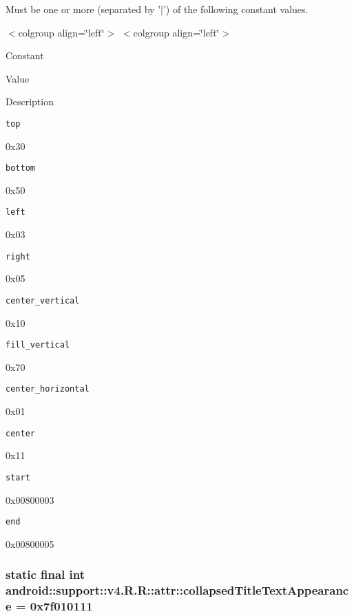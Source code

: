 Must be one or more (separated by '$|$') of the following constant values. \begin{TabularC}{0}
\hline
\end{TabularC}
$<$colgroup align=\char`\"{}left\char`\"{}$>$ $<$colgroup align=\char`\"{}left\char`\"{}$>$ 

Constant

Value

Description 

{\tt top}

0x30

{\tt bottom}

0x50

{\tt left}

0x03

{\tt right}

0x05

{\tt center\_\-vertical}

0x10

{\tt fill\_\-vertical}

0x70

{\tt center\_\-horizontal}

0x01

{\tt center}

0x11

{\tt start}

0x00800003

{\tt end}

0x00800005\hypertarget{classandroid_1_1support_1_1v4_1_1_r_1_1attr_2877729024cc40bad1476ada6761d168}{
\subsubsection[{collapsedTitleTextAppearance}]{\setlength{\rightskip}{0pt plus 5cm}static final int android::support::v4.R.R::attr::collapsedTitleTextAppearance = 0x7f010111}}
\label{classandroid_1_1support_1_1v4_1_1_r_1_1attr_2877729024cc40bad1476ada6761d168}


